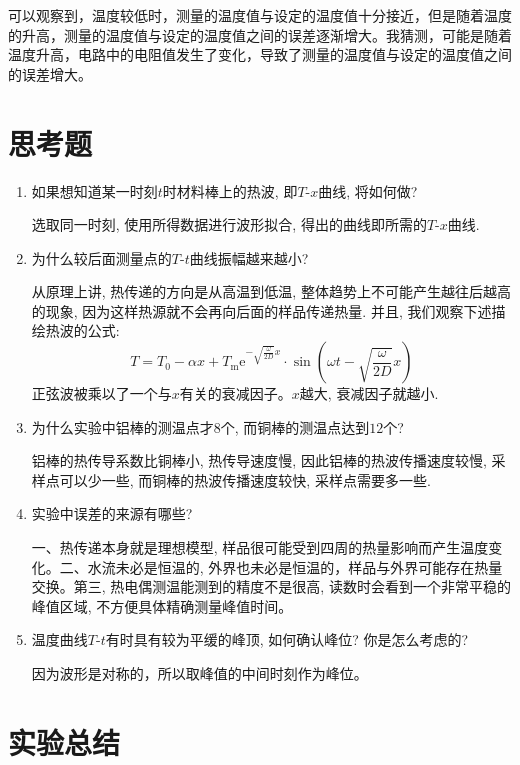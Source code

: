 \documentclass[11pt]{article}
\begin{document}
可以观察到，温度较低时，测量的温度值与设定的温度值十分接近，但是随着温度的升高，测量的温度值与设定的温度值之间的误差逐渐增大。我猜测，可能是随着温度升高，电路中的电阻值发生了变化，导致了测量的温度值与设定的温度值之间的误差增大。

\section{思考题}

\begin{enumerate}

    \item 如果想知道某一时刻$t$时材料棒上的热波, 即$T$-$x$曲线, 将如何做? 
    
    选取同一时刻, 使用所得数据进行波形拟合, 得出的曲线即所需的$T$-$x$曲线.

    \item 为什么较后面测量点的$T$-$t$曲线振幅越来越小? 
    
    从原理上讲, 热传递的方向是从高温到低温, 整体趋势上不可能产生越往后越高的现象, 因为这样热源就不会再向后面的样品传递热量. 并且, 我们观察下述描绘热波的公式:
    \[
        T = T_0 - \alpha x + T_{\mathrm{m}} \mathrm{e}^{-\sqrt{\frac{\omega}{2D}}x} \cdot \sin \left( \omega t - \sqrt{\frac{\omega}{2D}}x \right)
    \]
    正弦波被乘以了一个与$x$有关的衰减因子。$x$越大, 衰减因子就越小.

    \item 为什么实验中铝棒的测温点才$8$个, 而铜棒的测温点达到$12$个? 
    
    铝棒的热传导系数比铜棒小, 热传导速度慢, 因此铝棒的热波传播速度较慢, 采样点可以少一些, 而铜棒的热波传播速度较快, 采样点需要多一些.

    \item 实验中误差的来源有哪些? 
    
    一、热传递本身就是理想模型, 样品很可能受到四周的热量影响而产生温度变化。二、水流未必是恒温的, 外界也未必是恒温的，样品与外界可能存在热量交换。第三, 热电偶测温能测到的精度不是很高, 读数时会看到一个非常平稳的峰值区域, 不方便具体精确测量峰值时间。

    \item 温度曲线$T$-$t$有时具有较为平缓的峰顶, 如何确认峰位? 你是怎么考虑的? 

    因为波形是对称的，所以取峰值的中间时刻作为峰位。

\end{enumerate}

\section{实验总结}
\end{document}

